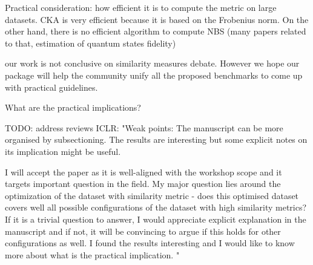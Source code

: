 \documentclass{article} %
\begin{document}
\citep{ostrow2023geometry}
Practical consideration: how efficient it is to compute the metric on large datasets. CKA is very efficient because it is based on the Frobenius norm. On the other hand, there is no efficient algorithm to compute NBS (many papers related to that, estimation of quantum states fidelity)

our work is not conclusive on similarity measures debate. However we hope our package will help the community unify all the proposed benchmarks to come up with practical guidelines.


What are the practical implications?

TODO: address reviews ICLR:
"Weak points: The manuscript can be more organised by subsectioning. The results are interesting but some explicit notes on its implication might be useful. 

I will accept the paper as it is well-aligned with the workshop scope and it targets important question in the field. My major question lies around the optimization of the dataset with similarity metric - does this optimised dataset covers well all possible configurations of the dataset with high similarity metrics? If it is a trivial question to answer, I would appreciate explicit explanation in the manuscript and if not, it will be convincing to argue if this holds for other configurations as well. I found the results interesting and I would like to know more about what is the practical implication. "
\end{document}
